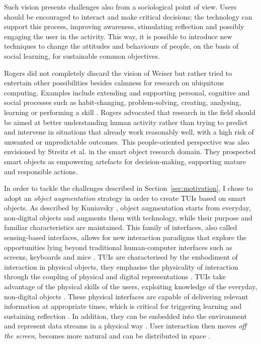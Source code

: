 Such vision presents challenges also from a sociological point of view. Users should be encouraged to interact and make critical decisions; the technology can support this process, improving awareness, stimulating reflection and possibly engaging the user in the activity.
This way, it is possible to introduce new techniques to change the attitudes and behaviours of people, on the basis of social learning, for sustainable common objectives.

Rogers did not completely discard the vision of Weiser but rather tried to entertain other possibilities besides calmness for research on ubiquitous computing.
Examples include extending and supporting personal, cognitive and social processes such as habit-changing, problem-solving, creating, analysing, learning or performing a skill \autocite{rogers_moving_2006}.
Rogers advocated that research in the field should be aimed at better understanding human activity rather than trying to predict and intervene in situations that already work reasonably well, with a high risk of unwanted or unpredictable outcomes. This people-oriented perspective was also envisioned by Streitz et al. \autocite*{streitz_designing_2005} in the smart object research domain. They prospected smart objects as empowering artefacts for decision-making, supporting mature and responsible actions.

In order to tackle the challenges described in Section~\ref{sec:motivation}, I chose to adopt an \textit{object augmentation} strategy in order to create TUIs based on smart objects. As described by Kuniavsky \autocite*[p. 254]{kuniavsky_smart_2010}, object augmentation starts from everyday, non-digital objects and augments them with technology, while their purpose and familiar characteristics are maintained.
This family of interfaces, also called sensing-based interfaces, allows for new interaction paradigms that explore the opportunities lying beyond traditional human-computer interfaces such as screens, keyboards and mice \autocite{van_dam_post-wimp_1997}. TUIs are characterised by the embodiment of interaction in physical objects, they emphasise the physicality of interaction through the coupling of physical and digital representations \autocite{markova_tangible_2012}.
TUIs take advantage of the physical skills of the users, exploiting knowledge of the everyday, non-digital objects \autocite{jacob_reality-based_2008}.
These physical interfaces are capable of delivering relevant information at appropriate times, which is critical for triggering learning and sustaining reflection \autocite{rogers_framework_2006}. In addition, they can be embedded into the environment and represent data streams in a physical way \autocite{hornecker_getting_2006}. User interaction then moves \textit{off the screen}, becomes more natural and can be distributed in space \autocite{dourish_where_2004}.

